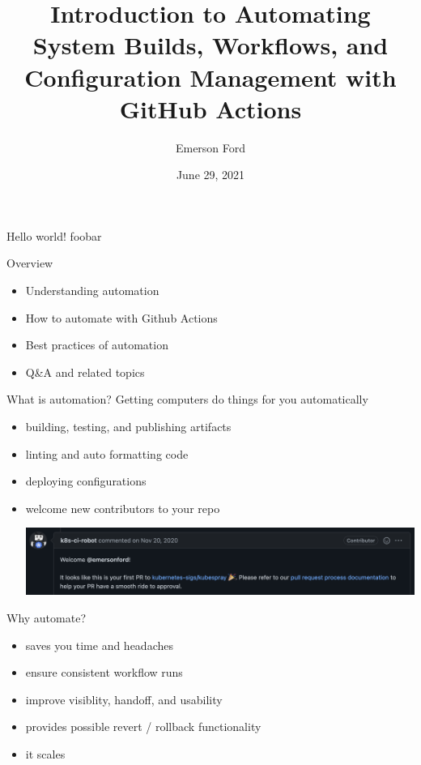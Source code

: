 \documentclass{beamer}
\title{Introduction to Automating System Builds, Workflows, and Configuration Management with GitHub Actions}
\date{June 29, 2021}
\author{Emerson Ford}
\institute{University of Utah --- ITX Meeting}
\begin{document}
\maketitle

\begin{frame}{Hello world!}
    foobar
\end{frame}

\begin{frame}{Overview}
    \begin{itemize}
        \item Understanding automation
        \item How to automate with Github Actions
        \item Best practices of automation
        \item Q\&A and related topics
    \end{itemize}
\end{frame}

\begin{frame}{What is automation?}
    Getting computers do things for you automatically
    \begin{itemize}
        \item building, testing, and publishing artifacts
        \item linting and auto formatting code
        \item deploying configurations
        \item welcome new contributors to your repo \begin{minipage}{\linewidth}\vspace{2pt}\includegraphics[width=0.8\linewidth]{welcome.png}\end{minipage}
    \end{itemize}
\end{frame}

\begin{frame}{Why automate?}
    \begin{itemize}
        \item saves you time and headaches
        \item ensure consistent workflow runs
        \item improve visiblity, handoff, and usability
        \item provides possible revert / rollback functionality
        \item it scales
    \end{itemize}
\end{frame}
\end{document}

